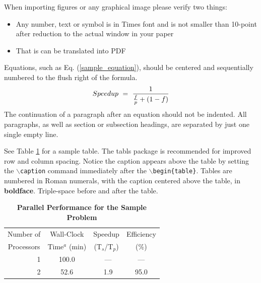 \documentclass{mc2013}
\begin{document}
When importing figures or any graphical image please verify two things:
\begin{itemize}
\item Any number, text or symbol is in Times font and is not smaller than 
    10-point after reduction to the actual window in your paper
\item That is can be translated into PDF
\end{itemize}


Equations, such as Eq. (\ref{sample_equation}), should be centered and 
sequentially numbered to the flush right of the formula.
\begin{equation}
\label{sample_equation}
Speedup\ =\ {1 \over{{f \over {p}} + (1-f)}}
\end{equation}
The continuation of a paragraph after an equation should not be indented.  
All paragraphs, as well as section or subsection headings, are separated by 
just one single empty line.



See Table \ref{table:example} for a sample table.  The tabls package is
recommended for improved row and column spacing.  Notice the caption appears 
above the table by setting the \texttt{$\backslash$caption} command immediately 
after the \texttt{$\backslash$begin\{table\}}. Tables are numbered in Roman 
numerals, with the caption centered above the table, in {\bf boldface}.  
Triple-space before and after the table.

\vspace{16pt}
\begin{table}[!htb]
\centering
\caption{\bf Parallel Performance for the Sample Problem}
\label{table:example} 
\vspace{14pt}
\begin{tabular}{||r||c|c|c||} \hline \hline
 \multicolumn{1}{||c||}{Number of} &
 \multicolumn{1}{c|}{Wall-Clock} &
 \multicolumn{1}{c|}{Speedup} &
 \multicolumn{1}{c||}{Efficiency} \\
 \multicolumn{1}{||c||}{Processors} &
 \multicolumn{1}{c|}{Time$^{a}$ (min)} &
 \multicolumn{1}{c|}{(T$_{s}$/T$_{p}$)} &
 \multicolumn{1}{c||}{(\%)} \\ \hline\hline
\ 1 &  100.0 & \ ---    & ---  \\ \hline
\ 2 &   52.6 & \ 1.9    & 95.0 \\ \hline \hline
\end{tabular}
\end{table}
\vspace{16pt}
\end{document}
